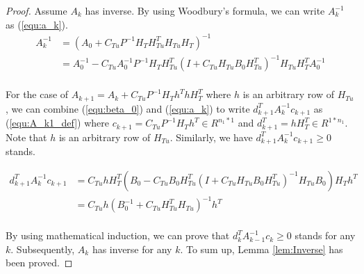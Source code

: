 \documentclass{standalone}
\begin{document}
\begin{proof}
Assume $A_k$ has inverse. By using Woodbury's formula, we can write $A_k^{-1}$ as (\ref{equ:a_k}).
\begin{equation}
\label{equ:a_k}
\begin{aligned}
A_k^{-1} & = (A_0 + C_{Tu} P^{-1} H_T H_{Tu}^T H_{Tu} H_T)^{-1} \\
&= A_0^{-1} -C_{Tu} A_0^{-1} P^{-1} H_T H_{Tu}^T  (I+ C_{Tu} H_{Tu} B_0 H_{Tu}^T)^{-1} H_{Tu} H_T^T A_0^{-1} \\
\end{aligned}
\end{equation}

For the case of $A_{k+1}=A_k +C_{Tu}P^{-1}H_T h^T h H_T^T$ where $h$ is an arbitrary row of $H_{Tu}$, we can combine (\ref{equ:beta_0}) and (\ref{equ:a_k}) to write $d_{k+1}^T A_k^{-1} c_{k+1}$ as (\ref{equ:A_k1_def}) where $c_{k+1}=C_{Tu} P^{-1}H_T h^T \in R^{n_1*1}$ and $d_{k+1}^T = h H_T^T \in R^{1*n_1}$. Note that $h$ is an arbitrary row of $H_{Tu}$. Similarly, we have $d_{k+1}^T A_k^{-1} c_{k+1} \ge 0$ stands.

\begin{equation}
\label{equ:A_k1_def}
\begin{aligned}
 d_{k+1}^T A_k^{-1} c_{k+1} &= C_{Tu} h H_T^T(B_0 - C_{Tu} B_0 H_{Tu}^T (I +  C_{Tu} H_{Tu} B_0  H_{Tu}^T)^{-1} H_{Tu} B_0)H_T h^T \\
&=C_{Tu} h (B_0^{-1}+C_{Tu} H_{Tu}^T H_{Tu})^{-1} h^T \\
\end{aligned}
\end{equation}

By using mathematical induction, we can prove that $d_{k}^T A_{k-1}^{-1} c_{k} \ge 0$ stands for any $k$. Subsequently, $A_k$ has inverse for any $k$. To sum up, Lemma \ref{lem:Inverse} has been proved.
\end{proof}
\end{document}
